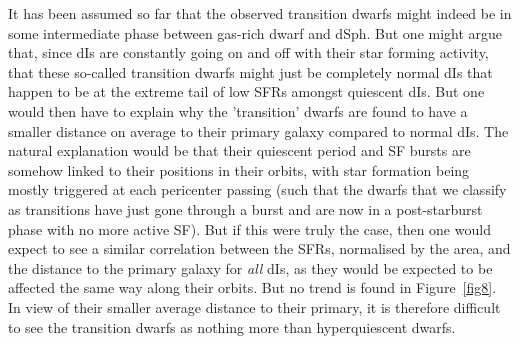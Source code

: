 \documentclass[preprint]{aastex}
\begin{document}
It has been assumed so far that the observed transition dwarfs
might indeed be in some intermediate phase between gas-rich dwarf and dSph.
But one might argue that, since dIs are constantly going on and off with
their star forming activity, that these so-called transition dwarfs might just
be completely normal dIs that happen to be at the extreme tail of low 
SFRs amongst quiescent dIs.
But one would then have to explain why the 'transition' dwarfs are found to have
a smaller distance on average to their primary galaxy compared to normal dIs. 
The natural explanation would be that their quiescent period and SF bursts are 
somehow linked to their positions in 
their orbits, with star formation being mostly triggered at each pericenter passing
(such that the dwarfs that we classify as transitions have just gone through a burst 
and are now in a post-starburst phase with no more active SF).
 But if this were truly the case,
then one would expect to see a similar correlation between the SFRs,
normalised by the area, and the distance to the primary galaxy for {\it all} dIs,
as they would be expected to be affected the same way
  along their orbits. But no trend is found in Figure~\ref{fig8}. 
In view of their smaller average distance to their primary, it
is therefore difficult to see the transition dwarfs as nothing more than
hyperquiescent dwarfs.
\end{document}
